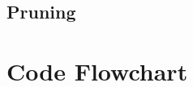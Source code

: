 \documentclass[a4paper]{article}
\begin{document}
\subsection{Pruning}

\clearpage


\section{Code Flowchart}

\clearpage

\end{document}
